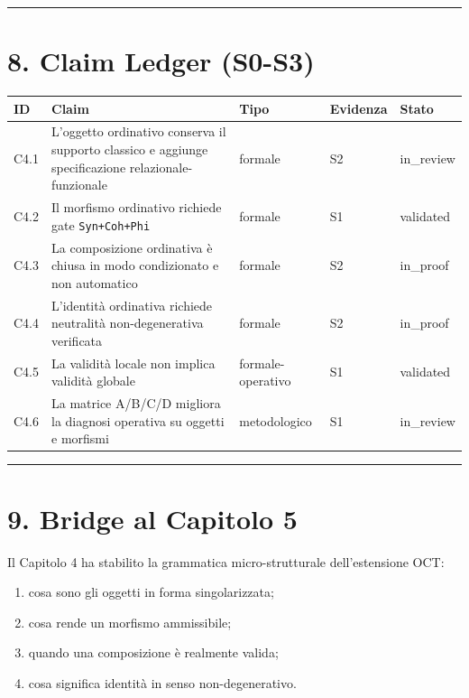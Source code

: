 \begin{center}\rule{0.5\linewidth}{0.5pt}\end{center}

\section{8. Claim Ledger (S0-S3)}

{\def\LTcaptype{none} %
\begin{longtable}[]{@{}lllll@{}}
\toprule\noalign{}
ID & Claim & Tipo & Evidenza & Stato \\
\midrule\noalign{}
\endhead
\bottomrule\noalign{}
\endlastfoot
C4.1 & L'oggetto ordinativo conserva il supporto classico e aggiunge specificazione relazionale-funzionale & formale & S2 & in\_review \\
C4.2 & Il morfismo ordinativo richiede gate \texttt{Syn+Coh+Phi} & formale & S1 & validated \\
C4.3 & La composizione ordinativa è chiusa in modo condizionato e non automatico & formale & S2 & in\_proof \\
C4.4 & L'identità ordinativa richiede neutralità non-degenerativa verificata & formale & S2 & in\_proof \\
C4.5 & La validità locale non implica validità globale & formale-operativo & S1 & validated \\
C4.6 & La matrice A/B/C/D migliora la diagnosi operativa su oggetti e morfismi & metodologico & S1 & in\_review \\
\end{longtable}
}

\begin{center}\rule{0.5\linewidth}{0.5pt}\end{center}

\section{9. Bridge al Capitolo 5}

Il Capitolo 4 ha stabilito la grammatica micro-strutturale dell'estensione OCT:

\begin{enumerate}
\def\labelenumi{\arabic{enumi}.}
\tightlist
\item
  cosa sono gli oggetti in forma singolarizzata;
\item
  cosa rende un morfismo ammissibile;
\item
  quando una composizione è realmente valida;
\item
  cosa significa identità in senso non-degenerativo.
\end{enumerate}

